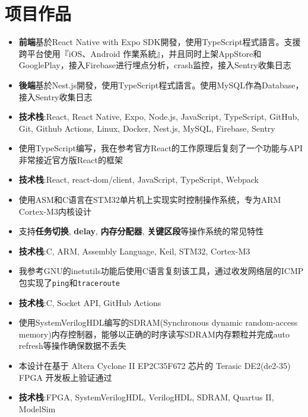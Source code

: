 \documentclass{resume}
\newcommand{\iconsection}[2]{
  \section[\texorpdfstring{#2}{#2}]{\faIcon{#1}\quad #2}
}
\begin{document}
\iconsection{list}{项目作品}
        \begin{itemize}
            \item \textbf{前端}基於React Native with Expo SDK開發，使用TypeScript程式語言。支援跨平台使用『iOS、Android 作業系統』，并且同时上架AppStore和GooglePlay，接入Firebase进行埋点分析，crash监控，接入Sentry收集日志
            \item \textbf{後端}基於Nest.js開發，使用TypeScript程式語言。使用MySQL作為Database，接入Sentry收集日志
            \item \textbf{技术栈}:React, React Native, Expo, Node.js, JavaScript, TypeScript, GitHub, Git, Github Actions, Linux, Docker, Nest.js, MySQL, Firebase, Sentry
        \end{itemize}
        \begin{itemize}
            \item 使用TypeScript编写，我在参考官方React的工作原理后复刻了一个功能与API非常接近官方版React的框架
            \item \textbf{技术栈}:React, react-dom/client, JavaScript, TypeScript, Webpack
        \end{itemize}
        \begin{itemize}
            \item 使用ASM和C语言在STM32单片机上实现实时控制操作系统，专为ARM Cortex-M3内核设计
            \item 支持\textbf{任务切换}, \textbf{delay}, \textbf{内存分配器}, \textbf{关键区段}等操作系统的常见特性
            \item \textbf{技术栈}:C, ARM, Assembly Language, Keil, STM32, Cortex-M3
        \end{itemize}
        \begin{itemize}
            \item 我参考GNU的inetutils功能后使用C语言复刻该工具，通过收发网络层的ICMP包实现了\texttt{ping}和\texttt{traceroute}
            \item \textbf{技术栈}:C, Socket API, GitHub Actions
        \end{itemize}
        \begin{itemize}
            \item 使用SystemVerilogHDL编写的SDRAM(Synchronous dynamic random-access memory)内存控制器，能够以正确的时序读写SDRAM内存颗粒并完成auto refresh等操作确保数据不丢失
            \item 本设计在基于 Altera Cyclone II EP2C35F672 芯片的 Terasic DE2(de2-35) FPGA 开发板上验证通过
            \item \textbf{技术栈}:FPGA, SystemVerilogHDL, VerilogHDL, SDRAM, Quartus II, ModelSim
        \end{itemize}
\end{document}
